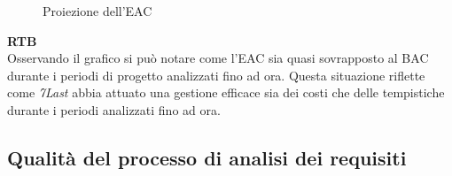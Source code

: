 \begin{figure*}[!h]
    \caption{Proiezione dell'EAC}
\end{figure*}
\begin{flushleft}
\textbf{RTB} \\
Osservando il grafico si può notare come l'EAC sia quasi sovrapposto al BAC durante i periodi di progetto analizzati fino ad ora. Questa situazione riflette come \textit{7Last} abbia attuato una gestione efficace sia dei costi che delle tempistiche durante i periodi analizzati fino ad ora. \\
\end{flushleft}

\newpage
\subsection{Qualità del processo di analisi dei requisiti}
